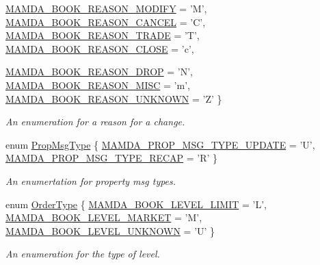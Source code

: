 \begin{CompactItemize}
\hyperlink{classWombat_1_1MamdaOrderBookTypes_a1147c14315f68b9371c92a6a259fbd58c66d9f8efe5d084165af5826a27f984}{MAMDA\_\-BOOK\_\-REASON\_\-MODIFY} =  'M', 
\hyperlink{classWombat_1_1MamdaOrderBookTypes_a1147c14315f68b9371c92a6a259fbd576efc0c5dd58e7ab7fef01730ff3b6eb}{MAMDA\_\-BOOK\_\-REASON\_\-CANCEL} =  'C', 
\hyperlink{classWombat_1_1MamdaOrderBookTypes_a1147c14315f68b9371c92a6a259fbd56237b4212d23a32dbfa1b9c7b8653922}{MAMDA\_\-BOOK\_\-REASON\_\-TRADE} =  'T', 
\hyperlink{classWombat_1_1MamdaOrderBookTypes_a1147c14315f68b9371c92a6a259fbd578d9edd5a28a475e2fc14646f942e952}{MAMDA\_\-BOOK\_\-REASON\_\-CLOSE} =  'c', 
\par
\hyperlink{classWombat_1_1MamdaOrderBookTypes_a1147c14315f68b9371c92a6a259fbd5fca7fc200b4c5d50bb891b6e75fd4a7d}{MAMDA\_\-BOOK\_\-REASON\_\-DROP} =  'N', 
\hyperlink{classWombat_1_1MamdaOrderBookTypes_a1147c14315f68b9371c92a6a259fbd5912709034d0ce5e6f91da2544d775be6}{MAMDA\_\-BOOK\_\-REASON\_\-MISC} =  'm', 
\hyperlink{classWombat_1_1MamdaOrderBookTypes_a1147c14315f68b9371c92a6a259fbd514c83d7de2b7b3b34b8dbb71a62dc4d0}{MAMDA\_\-BOOK\_\-REASON\_\-UNKNOWN} =  'Z'
 \}
\begin{CompactList}\small\item\em An enumeration for a reason for a change. \item\end{CompactList}\item 
enum \hyperlink{classWombat_1_1MamdaOrderBookTypes_26ecc0a14e1e6bce991aff91b987c5e4}{Prop\-Msg\-Type} \{ \hyperlink{classWombat_1_1MamdaOrderBookTypes_26ecc0a14e1e6bce991aff91b987c5e42dd181d5edf1af964fdbb8bfb67a14b4}{MAMDA\_\-PROP\_\-MSG\_\-TYPE\_\-UPDATE} =  'U', 
\hyperlink{classWombat_1_1MamdaOrderBookTypes_26ecc0a14e1e6bce991aff91b987c5e4b659285b56938f7f69a4855712b172ae}{MAMDA\_\-PROP\_\-MSG\_\-TYPE\_\-RECAP} =  'R'
 \}
\begin{CompactList}\small\item\em An enumertation for property msg types. \item\end{CompactList}\item 
enum \hyperlink{classWombat_1_1MamdaOrderBookTypes_b1b75d93c83c5a1042c392ab46a27291}{Order\-Type} \{ \hyperlink{classWombat_1_1MamdaOrderBookTypes_b1b75d93c83c5a1042c392ab46a2729154ced231e34205e73455fc9c3fcd0874}{MAMDA\_\-BOOK\_\-LEVEL\_\-LIMIT} =  'L', 
\hyperlink{classWombat_1_1MamdaOrderBookTypes_b1b75d93c83c5a1042c392ab46a2729111e98055b373d210242bd004151cf4e0}{MAMDA\_\-BOOK\_\-LEVEL\_\-MARKET} =  'M', 
\hyperlink{classWombat_1_1MamdaOrderBookTypes_b1b75d93c83c5a1042c392ab46a27291b7d57a8b905d6ea9a0c1b10747b54bdc}{MAMDA\_\-BOOK\_\-LEVEL\_\-UNKNOWN} =  'U'
 \}
\begin{CompactList}\small\item\em An enumeration for the type of level. \item\end{CompactList}\end{CompactItemize}



